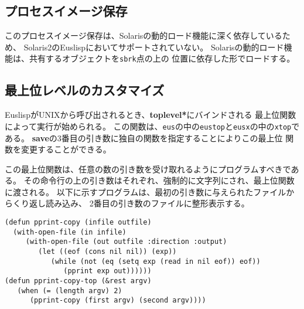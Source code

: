 \subsection{プロセスイメージ保存}
このプロセスイメージ保存は、Solarisの動的ロード機能に深く依存しているため、
Solaris2のEuslispにおいてサポートされていない。
Solarisの動的ロード機能は、共有するオブジェクトを{\tt sbrk}点の上の
位置に依存した形でロードする。

\begin{refdesc}

\end{refdesc}

\subsection{最上位レベルのカスタマイズ}
EuslispがUNIXから呼び出されるとき、{\bf *toplevel*}にバインドされる
最上位関数によって実行が始められる。
この関数は、{\tt eus}の中の{\tt eustop}と{\tt eusx}の中の{\tt xtop}である。
{\bf save}の3番目の引き数に独自の関数を指定することによりこの最上位
関数を変更することができる。

この最上位関数は、任意の数の引き数を受け取れるようにプログラムすべきである。
その命令行の上の引き数はそれぞれ、強制的に文字列にされ、最上位関数に渡される。
以下に示すプログラムは、最初の引き数に与えられたファイルからくり返し読み込み、
2番目の引き数のファイルに整形表示する。

\begin{verbatim}
(defun pprint-copy (infile outfile)
  (with-open-file (in infile)
     (with-open-file (out outfile :direction :output)
        (let ((eof (cons nil nil)) (exp))
           (while (not (eq (setq exp (read in nil eof)) eof))
              (pprint exp out))))))
(defun pprint-copy-top (&rest argv)
   (when (= (length argv) 2)
      (pprint-copy (first argv) (second argv))))
\end{verbatim}


